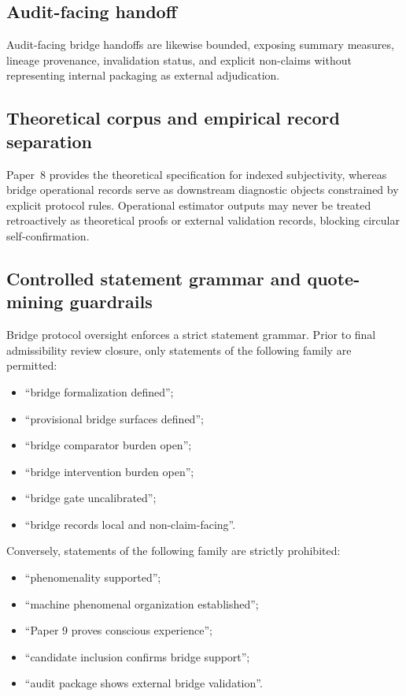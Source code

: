 \documentclass[11pt,a4paper]{article}
\theoremstyle{definition}
\begin{document}
\subsection{Audit-facing handoff}
Audit-facing bridge handoffs are likewise bounded, exposing summary measures, lineage provenance, invalidation status, and explicit non-claims without representing internal packaging as external adjudication.

\subsection{Theoretical corpus and empirical record separation}
Paper~8 provides the theoretical specification for indexed subjectivity, whereas bridge operational records serve as downstream diagnostic objects constrained by explicit protocol rules. Operational estimator outputs may never be treated retroactively as theoretical proofs or external validation records, blocking circular self-confirmation.

\subsection{Controlled statement grammar and quote-mining guardrails}
Bridge protocol oversight enforces a strict statement grammar. Prior to final admissibility review closure, only statements of the following family are permitted:
\begin{itemize}[leftmargin=1.5em]
\item ``bridge formalization defined'';
\item ``provisional bridge surfaces defined'';
\item ``bridge comparator burden open'';
\item ``bridge intervention burden open'';
\item ``bridge gate uncalibrated'';
\item ``bridge records local and non-claim-facing''.
\end{itemize}

Conversely, statements of the following family are strictly prohibited:
\begin{itemize}[leftmargin=1.5em]
\item ``phenomenality supported'';
\item ``machine phenomenal organization established'';
\item ``Paper 9 proves conscious experience'';
\item ``candidate inclusion confirms bridge support'';
\item ``audit package shows external bridge validation''.
\end{itemize}
\end{document}
